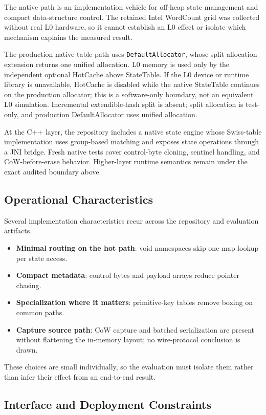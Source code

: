 \documentclass[journal]{IEEEtran}
\begin{document}
The native path is an implementation vehicle for off-heap state management and compact data-structure control. The retained Intel WordCount grid was collected without real L0 hardware, so it cannot establish an L0 effect or isolate which mechanism explains the measured result.

The production native table path uses \texttt{DefaultAllocator}, whose split-allocation extension returns one unified allocation. L0 memory is used only by the independent optional HotCache above StateTable. If the L0 device or runtime library is unavailable, HotCache is disabled while the native StateTable continues on the production allocator; this is a software-only boundary, not an equivalent L0 simulation. Incremental extendible-hash split is absent; split allocation is test-only, and production DefaultAllocator uses unified allocation.

At the C++ layer, the repository includes a native state engine whose Swiss-table implementation uses group-based matching and exposes state operations through a JNI bridge. Fresh native tests cover control-byte cloning, sentinel handling, and CoW-before-erase behavior. Higher-layer runtime semantics remain under the exact audited boundary above.

\subsection{Operational Characteristics}

Several implementation characteristics recur across the repository and evaluation artifacts.
\begin{itemize}
\item \textbf{Minimal routing on the hot path}: void namespaces skip one map lookup per state access.
\item \textbf{Compact metadata}: control bytes and payload arrays reduce pointer chasing.
\item \textbf{Specialization where it matters}: primitive-key tables remove boxing on common paths.
\item \textbf{Capture source path}: CoW capture and batched serialization are present without flattening the in-memory layout; no wire-protocol conclusion is drawn.
\end{itemize}

These choices are small individually, so the evaluation must isolate them rather than infer their effect from an end-to-end result.

\subsection{Interface and Deployment Constraints}
\end{document}
